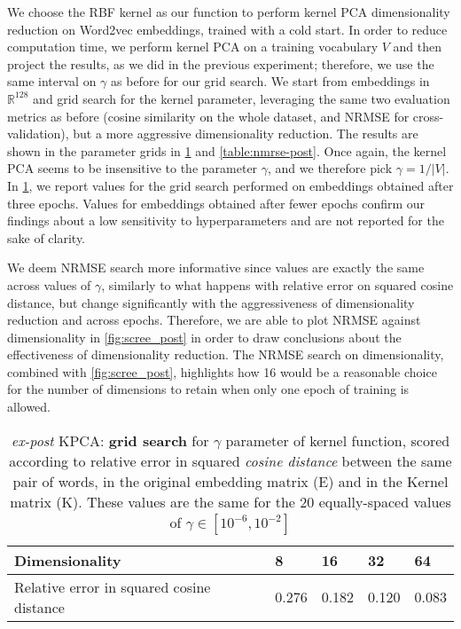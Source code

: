We choose the RBF kernel as our function to perform kernel PCA dimensionality reduction on Word2vec embeddings, trained with a cold start.
In order to reduce computation time, we perform kernel PCA on a training vocabulary $V$ and then project the results, as we did in the previous experiment; therefore, we use the same interval on $\gamma$ as before for our grid search.
We start from embeddings in $\mathbb{R}^{128}$ and grid search for the kernel parameter, leveraging the same two evaluation metrics as before (cosine similarity on the whole dataset, and NRMSE for cross-validation), but a more aggressive dimensionality reduction. The results are shown in the parameter grids in \cref{table:cos-err-kpost} and \cref{table:nmrse-post}. 
Once again, the kernel PCA seems to be insensitive to the parameter $\gamma$, and we therefore pick $\gamma = 1/|V|$.
In \cref{table:cos-err-kpost}, we report values for the grid search performed on embeddings obtained after three epochs. 
Values for embeddings obtained after fewer epochs confirm our findings about a low sensitivity to hyperparameters and are not reported for the sake of clarity.

We deem NRMSE search more informative since values are exactly the same across values of $\gamma$, similarly to what happens with relative error on squared cosine distance, but change significantly with the aggressiveness of dimensionality reduction and across epochs.
Therefore, we are able to plot NRMSE against dimensionality in \cref{fig:scree_post} in order to draw conclusions about the effectiveness of dimensionality reduction. The NRMSE search on dimensionality, combined with \cref{fig:scree_post}, highlights how 16 would be a reasonable choice for the number of dimensions to retain when only one epoch of training is allowed.

\begin{table}[H]

\centering

\begin{tabular}{|l|l|l|l|l|}
\hline
\rowcolor[HTML]{C0C0C0} 
Dimensionality & 8 & 16 & 32 & 64  \\ \hline
\cellcolor[HTML]{C0C0C0}Relative error in squared cosine distance & 0.276 & 0.182 & 0.120 & 0.083 \\ \hline
\end{tabular}

\caption{\textit{ex-post} KPCA: \textbf{grid search} for $\gamma$ parameter of kernel function, scored according to relative error in squared \textit{cosine distance} between the same pair of words, in the original embedding matrix (E) and in the Kernel matrix (K). These values are the same for the 20 equally-spaced values of $\gamma \in [10^{-6}, 10^{-2}]$}
\label{table:cos-err-kpost}
\end{table}







